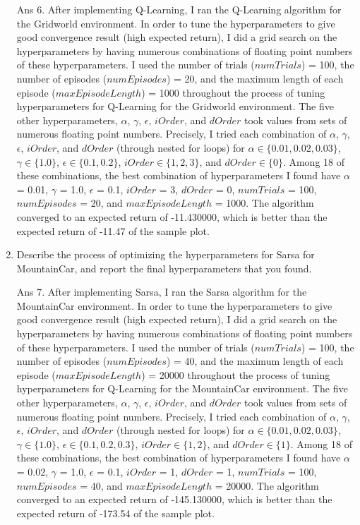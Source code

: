 \documentclass[]{article}
\begin{document}
\begin{enumerate}
	{
		\color{blue}
		Ans 6. After implementing Q-Learning, I ran the Q-Learning algorithm for the Gridworld environment. In order to tune the hyperparameters to give good convergence result (high expected return), I did a grid search on the hyperparameters by having numerous combinations of floating point numbers of these hyperparameters. I used the number of trials ($numTrials$) = 100, the number of episodes ($numEpisodes$) = 20, and the maximum length of each episode ($maxEpisodeLength$) = 1000 throughout the process of tuning hyperparameters for Q-Learning for the Gridworld environment. The five other hyperparameters, $\alpha$, $\gamma$, $\epsilon$, $iOrder$, and $dOrder$ took values from sets of numerous floating point numbers. Precisely, I tried each combination of $\alpha$, $\gamma$, $\epsilon$, $iOrder$, and $dOrder$ (through nested for loops) for $\alpha \in \{0.01, 0.02, 0.03\}$, $\gamma \in \{1.0\}$, $\epsilon \in \{0.1, 0.2\}$, $iOrder \in \{1, 2, 3\}$, and $dOrder \in \{0\}$. Among 18 of these combinations, the best combination of hyperparameters I found have $\alpha$ = 0.01, $\gamma$ = 1.0, $\epsilon$ = 0.1, $iOrder$ = 3, $dOrder$ =  0, $numTrials$ = 100, $numEpisodes$ = 20, and $maxEpisodeLength$ = 1000. The algorithm converged to an expected return of -11.430000, which is better than the expected return of -11.47 of the sample plot.

	}

    \item Describe the process of optimizing the hyperparameters for Sarsa for MountainCar, and report the final hyperparameters that you found.

	{
		\color{blue}
		Ans 7. After implementing Sarsa, I ran the Sarsa algorithm for the MountainCar environment. In order to tune the hyperparameters to give good convergence result (high expected return), I did a grid search on the hyperparameters by having numerous combinations of floating point numbers of these hyperparameters. I used the number of trials ($numTrials$) = 100, the number of episodes ($numEpisodes$) = 40, and the maximum length of each episode ($maxEpisodeLength$) = 20000 throughout the process of tuning hyperparameters for Q-Learning for the MountainCar environment. The five other hyperparameters, $\alpha$, $\gamma$, $\epsilon$, $iOrder$, and $dOrder$ took values from sets of numerous floating point numbers. Precisely, I tried each combination of $\alpha$, $\gamma$, $\epsilon$, $iOrder$, and $dOrder$ (through nested for loops) for $\alpha \in \{0.01, 0.02, 0.03\}$, $\gamma \in \{1.0\}$, $\epsilon \in \{0.1, 0.2, 0.3\}$, $iOrder \in \{1, 2\}$, and $dOrder \in \{1\}$. Among 18 of these combinations, the best combination of hyperparameters I found have $\alpha$ = 0.02, $\gamma$ = 1.0, $\epsilon$ = 0.1, $iOrder$ = 1, $dOrder$ =  1, $numTrials$ = 100, $numEpisodes$ = 40, and $maxEpisodeLength$ = 20000. The algorithm converged to an expected return of -145.130000, which is better than the expected return of -173.54 of the sample plot.
	}


\end{enumerate}
\end{document}
